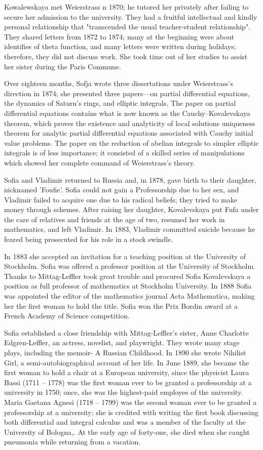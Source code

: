\documentclass[12pt,a4paper]{article}
\begin{document}
Kowalewskaya met Weierstrass n 1870; he tutored her privately after failing to secure her admission to the university. They had a fruitful intellectual and kindly personal relationship that "transcended the usual teacher-student relationship". They shared letters from 1872 to 1874; many at the beginning were about identifies of theta function, and many letters were written during holidays; therefore, they did not discuss work. She took time out of her studies to assist her sister during the Paris Commune. 

Over eighteen months, Sofja wrote three dissertations under Weierstrass's direction in 1874; she presented three papers—on partial differential equations, the dynamics of Saturn's rings, and elliptic integrals. The paper on partial differential equations contains what is now known as the Cauchy–Kovalevskaya theorem, which proves the existence and analyticity of local solutions uniqueness theorem for analytic partial differential equations associated with Cauchy initial value problems. The paper on the reduction of abelian integrals to simpler elliptic integrals is of less importance; it consisted of a skilled series of manipulations which showed her complete command of Weierstrass's theory. 

Sofia and Vladimir returned to Russia and, in 1878, gave birth to their daughter, nicknamed 'Foufie'. Sofia could not gain a Professorship due to her sex, and Vladimir failed to acquire one due to his radical beliefs; they tried to make money through schemes. After raising her daughter, Kovalevskaya put Fufa under the care of relatives and friends at the age of two, resumed her work in mathematics, and left Vladimir. In 1883, Vladimir committed suicide because he feared being prosecuted for his role in a stock swindle.

In 1883 she accepted an invitation for a teaching position at the University of Stockholm. Sofia was offered a professor position at the University of Stockholm. Thanks to Mittag-Leffler took great trouble and procured Sofia Kovalevskaya a position as full professor of mathematics at Stockholm University. In 1888 Sofia was appointed the editor of the mathematics journal Acta Mathematica, making her the first woman to hold the title. Sofia won the Prix Bordin award at a French Academy of Science competition.

Sofia established a close friendship with Mittag-Leffler's sister, Anne Charlotte Edgren-Leffler, an actress, novelist, and playwright. They wrote many stage plays, including the memoir- A Russian Childhood. In 1890 she wrote Nihilist Girl, a semi-autobiographical account of her life. In June 1889, she became the first woman to hold a chair at a European university, since the physicist Laura Bassi  (1711 – 1778) was the first woman ever to be granted a professorship at a university in 1750; once, she was the highest-paid employee of the university. Maria Gaetana Agnesi (1718 – 1799) was the second woman ever to be granted a professorship at a university; she is credited with writing the first book discussing both differential and integral calculus and was a member of the faculty at the University of Bologna,. At the early age of forty-one, she died when she caught pneumonia while returning from a vacation. 
\end{document}
